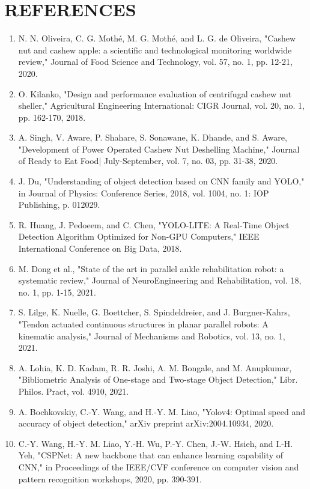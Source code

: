 \documentclass[10pt, letterpaper]{article}
\begin{document}
\section*{REFERENCES}
    \begin{enumerate}
        \item N. N. Oliveira, C. G. Mothé, M. G. Mothé, and L. G. de Oliveira, "Cashew nut and cashew apple: a scientific and technological monitoring worldwide review," Journal of Food Science and Technology, vol. 57, no. 1, pp. 12-21, 2020.
        \item O. Kilanko, "Design and performance evaluation of centrifugal cashew nut sheller," Agricultural Engineering International: CIGR Journal, vol. 20, no. 1, pp. 162-170, 2018.
        \item A. Singh, V. Aware, P. Shahare, S. Sonawane, K. Dhande, and S. Aware, "Development of Power Operated Cashew Nut Deshelling Machine," Journal of Ready to Eat Food| July-September, vol. 7, no. 03, pp. 31-38, 2020.
        \item J. Du, "Understanding of object detection based on CNN family and YOLO," in Journal of Physics: Conference Series, 2018, vol. 1004, no. 1: IOP Publishing, p. 012029.
        \item R. Huang, J. Pedoeem, and C. Chen, "YOLO-LITE: A Real-Time Object Detection Algorithm Optimized for Non-GPU Computers," IEEE International Conference on Big Data, 2018.
        \item M. Dong et al., "State of the art in parallel ankle rehabilitation robot: a systematic review," Journal of NeuroEngineering and Rehabilitation, vol. 18, no. 1, pp. 1-15, 2021.
        \item S. Lilge, K. Nuelle, G. Boettcher, S. Spindeldreier, and J. Burgner-Kahrs, "Tendon actuated continuous structures in planar parallel robots: A kinematic analysis," Journal of Mechanisms and Robotics, vol. 13, no. 1, 2021.
        \item A. Lohia, K. D. Kadam, R. R. Joshi, A. M. Bongale, and M. Anupkumar, "Bibliometric Analysis of One-stage and Two-stage Object Detection," Libr. Philos. Pract, vol. 4910, 2021.
        \item A. Bochkovskiy, C.-Y. Wang, and H.-Y. M. Liao, "Yolov4: Optimal speed and accuracy of object detection," arXiv preprint arXiv:2004.10934, 2020.
        \item C.-Y. Wang, H.-Y. M. Liao, Y.-H. Wu, P.-Y. Chen, J.-W. Hsieh, and I.-H. Yeh, "CSPNet: A new backbone that can enhance learning capability of CNN," in Proceedings of the IEEE/CVF conference on computer vision and pattern recognition workshops, 2020, pp. 390-391. 

\end{enumerate}
\end{document}
